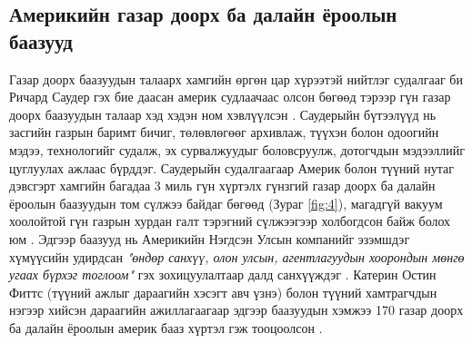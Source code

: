 \documentclass[10pt,twocolumn,letterpaper]{article}
\begin{document}
\subsection{Америкийн газар доорх ба далайн ёроолын баазууд}

Газар доорх баазуудын талаарх хамгийн өргөн цар хүрээтэй нийтлэг судалгааг би Ричард Саудер гэх бие даасан америк судлаачаас олсон бөгөөд тэрээр гүн газар доорх баазуудын талаар хэд хэдэн ном хэвлүүлсэн \cite{22}. Саудерыйн бүтээлүүд нь засгийн газрын баримт бичиг, төлөвлөгөөг архивлаж, түүхэн болон одоогийн мэдээ, технологийг судалж, эх сурвалжуудыг боловсруулж, дотогчдын мэдээллийг цуглуулах ажлаас бүрддэг. Саудерыйн судалгаагаар Америк болон түүний нутаг дэвсгэрт хамгийн багадаа 3 миль гүн хүртэлх гүнзгий газар доорх ба далайн ёроолын баазуудын том сүлжээ байдаг бөгөөд (Зураг \ref{fig:4}), магадгүй вакуум хоолойтой гүн газрын хурдан галт тэрэгний сүлжээгээр холбогдсон байж болох юм \cite{22}. Эдгээр баазууд нь Америкийн Нэгдсэн Улсын компанийг эзэмшдэг хүмүүсийн удирдсан \textit{"өндөр санхүү, олон улсын, агентлагуудын хоорондын мөнгө угаах бүрхэг тоглоом"} гэх зохицуулалтаар далд санхүүждэг \cite{22}. Катерин Остин Фиттс (түүний ажлыг дараагийн хэсэгт авч үзнэ) болон түүний хамтрагчдын нэгээр хийсэн дараагийн ажиллагаагаар эдгээр баазуудын хэмжээ 170 газар доорх ба далайн ёроолын америк бааз хүртэл гэж тооцоолсон \cite{16,20}.
\end{document}
